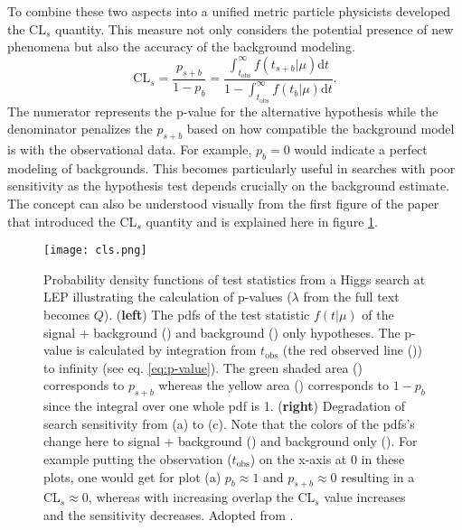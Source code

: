 To combine these two aspects into a unified metric particle physicists developed the CL$_s$ quantity. This measure not only considers the potential presence of new phenomena but also the accuracy of the background modeling.
\begin{equation}
    \mathrm{CL}_s=\frac{p_{s+b}}{1-p_{b}}=
    \frac
    {\int_{t_\text{obs}}^{\infty}
        f(t_{s+b} | \mu) \mathrm{d}t}
    {1-\int_{t_\text{obs}}^{\infty}
        f(t_{b} | \mu) \mathrm{d}t}.
\end{equation}
The numerator represents the p-value for the alternative hypothesis while the denominator penalizes the $p_{s+b}$ based on how compatible the background model is with the observational data. For example, $p_{b} = 0$ would indicate a perfect modeling of backgrounds. This becomes particularly useful in searches with poor sensitivity as the hypothesis test depends crucially on the background estimate. The concept can also be understood visually from the first figure of the paper that introduced the CL$_s$ quantity \citep{read2002presentation} and is explained here in figure \ref{fig:cls}.
\begin{figure}
    \centering
    \texttt{[image: cls.png]}
    \caption[]{Probability density functions of test statistics from a Higgs search at LEP illustrating the calculation of p-values ($\lambda$ from the full text becomes $Q$). (\textbf{left}) The \acp{pdf} of the test statistic $f(t | \mu)$ of the signal + background ({\color[HTML]{804000}{$\bm{\diagup}$}}) and background ({\color[HTML]{2100FF}{$\bm{\diagup}$}}) only hypotheses. The p-value is calculated by integration from $t_\text{obs}$ (the red observed line ({\color[HTML]{FF0000}{$\bm{\diagup}$}})) to infinity (see eq. \ref{eq:p-value}). The green shaded area () corresponds to $p_{s+b}$ whereas the yellow area () corresponds to $1-p_b$ since the integral over one whole \ac{pdf} is 1. (\textbf{right}) Degradation of search sensitivity from (a) to (c). Note that the colors of the \acp{pdf}'s change here to signal + background () and background only (). For example putting the observation ($t_\text{obs}$) on the x-axis at 0 in these plots, one would get for plot (a) $p_{b}\approx 1$ and $p_{s+b}\approx 0$ resulting in a CL$_s\approx 0$, whereas with increasing overlap the CL$_s$ value increases and the sensitivity decreases. Adopted from \citep{read2002presentation}.}
    \label{fig:cls}
\end{figure}


